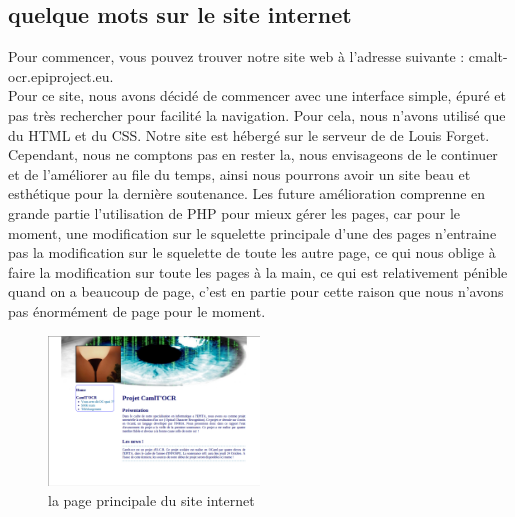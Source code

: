 \documentclass[12pt]{article}
\begin{document}
\subsection{quelque mots sur le site internet}
Pour commencer, vous pouvez trouver notre site web à l'adresse suivante : cmalt-ocr.epiproject.eu.\\
Pour ce site, nous avons décidé de commencer avec une interface simple, épuré et pas très rechercher pour facilité la navigation. Pour cela, nous n'avons utilisé que du HTML et du CSS. Notre site est hébergé sur le serveur de de Louis Forget. Cependant, nous ne comptons pas en rester la, nous envisageons de le continuer et de l'améliorer au file du temps, ainsi nous pourrons avoir un site beau et esthétique pour la dernière soutenance. Les future amélioration comprenne en grande partie l'utilisation de PHP pour mieux gérer les pages, car pour le moment, une modification sur le squelette principale d'une des pages n'entraine pas la modification sur le squelette de toute les autre page, ce qui nous oblige à faire la modification sur toute les pages à la main, ce qui est relativement pénible quand on a beaucoup de page, c'est en partie pour cette raison que nous n'avons pas énormément de page pour le moment.\\ 
\begin{figure}[h]
  \begin{center}
\includegraphics[width=0.50\textwidth]{img/site.png}
\caption{la page principale du site internet}
\end{center}
\end{figure}
\newpage 
\end{document}
